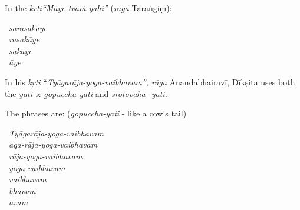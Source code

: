 \vspace{-.43cm}

In the \textit{kṛti“Māye tvaṁ yāhi”} (\textit{rāga} Taraṅgiṇī):

\vspace{-.45cm}

\begin{myquoteplus}
\begin{center}
~\hspace{.2cm}\textit{sarasakāye}\\ 
~\hspace{.422cm}\textit{rasakāye}\\ 
~\hspace{.652cm}\textit{sakāye}\\ 
~\hspace{1.05cm}\textit{āye}
\end{center}
\end{myquoteplus}

\vspace{-.43cm}

In his \textit{kṛti} “\textit{Tyāgarāja-yoga-vaibhavam”, rāga} Ānandabhairavī, Dīkṣita uses both the \textit{yati-s}: \textit{gopuccha-yati} and \textit{srotovahā -yati.}

The phrases are: (\textit{gopuccha-yati} - like a cow’s tail)

\vspace{-.45cm}

\begin{myquote}
\begin{center}
~\hspace{.3cm}\textit{Tyāgarāja-yoga-vaibhavam}\\ 
~\hspace{.49cm}\textit{aga-rāja-yoga-vaibhavam}\\ 
~\hspace{1cm}\textit{rāja-yoga-vaibhavam}\\ 
~\hspace{1.57cm}\textit{yoga-vaibhavam}\\ 
~\hspace{2.22cm}\textit{vaibhavam}\\ 
~\hspace{2.6cm}\textit{bhavam}\\ 
~\hspace{2.92cm}\textit{avam}
\end{center}
\end{myquote}

\vspace{-.43cm}

